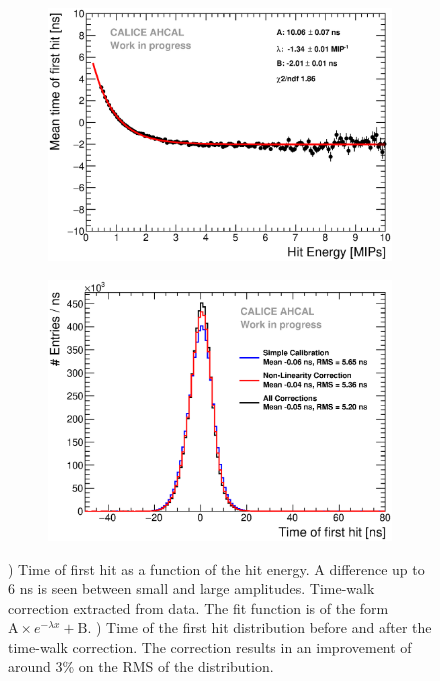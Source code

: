 \documentclass{JINST}
\begin{document}
\begin{figure}[htbp!]
  \begin{subfigure}[t]{0.49\textwidth}
    \centering
    \includegraphics[width=1\linewidth]{fig/TimeWalkProfile.eps}
    \caption{} \label{fig:time_walk}
  \end{subfigure}
  \hfill
  \begin{subfigure}[t]{0.49\textwidth}
    \centering
    \includegraphics[width=1\linewidth]{fig/Timing_AHCAL_AllCorrection.eps}
    \caption{} \label{fig:Timing_AllCorr}
  \end{subfigure}
  \caption{) Time of first hit as a function of the hit energy. A difference up to 6 ns is seen between small and large amplitudes. Time-walk correction extracted from data. The fit function is of the form $\text{A} \times e^{-\lambda{}x} + \text{B}$. ) Time of the first hit distribution before and after the time-walk correction. The correction results in an improvement of around 3\% on the RMS of the distribution.}
\end{figure}
\end{document}
